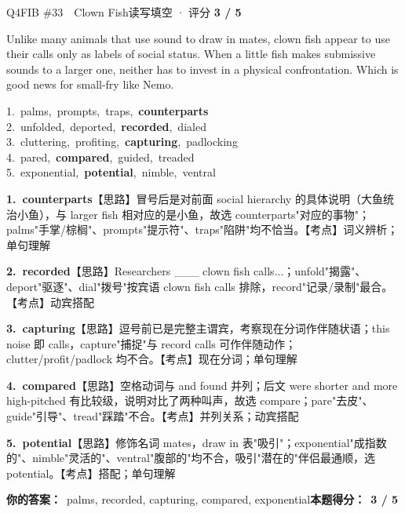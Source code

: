 \begin{qblock}{Q4\quad FIB \#33\ \ Clown Fish}{读写填空 · 评分 \textcolor{cAccent}{\bfseries 3 / 5}}
\begin{promptbox}
Unlike many animals that use sound to draw in  mates, clown fish appear to use their calls only as labels of social status. When a little fish makes submissive sounds to a larger one, neither has to invest in a physical confrontation. Which is good news for small-fry like Nemo.
\end{promptbox}
{\small
1.\ palms,\ prompts,\ traps,\ \textbf{counterparts}\\
2.\ unfolded,\ deported,\ \textbf{recorded},\ dialed\\
3.\ cluttering,\ profiting,\ \textbf{capturing},\ padlocking\\
4.\ pared,\ \textbf{compared},\ guided,\ treaded\\
5.\ exponential,\ \textbf{potential},\ nimble,\ ventral}
\begin{notebox}\footnotesize
\textbf{1.\ counterparts}\quad【思路】冒号后是对前面 social hierarchy 的具体说明（大鱼统治小鱼），与 larger fish 相对应的是小鱼，故选 counterparts"对应的事物"；palms"手掌/棕榈"、prompts"提示符"、traps"陷阱"均不恰当。【考点】词义辨析；单句理解\par\smallskip
\textbf{2.\ recorded}\quad【思路】Researchers \_\_\_ clown fish calls...；unfold"揭露"、deport"驱逐"、dial"拨号"按宾语 clown fish calls 排除，record"记录/录制"最合。【考点】动宾搭配\par\smallskip
\textbf{3.\ capturing}\quad【思路】逗号前已是完整主谓宾，考察现在分词作伴随状语；this noise 即 calls，capture"捕捉"与 record calls 可作伴随动作；clutter/profit/padlock 均不合。【考点】现在分词；单句理解\par\smallskip
\textbf{4.\ compared}\quad【思路】空格动词与 and found 并列；后文 were shorter and more high-pitched 有比较级，说明对比了两种叫声，故选 compare；pare"去皮"、guide"引导"、tread"踩踏"不合。【考点】并列关系；动宾搭配\par\smallskip
\textbf{5.\ potential}\quad【思路】修饰名词 mates，draw in 表"吸引"；exponential"成指数的"、nimble"灵活的"、ventral"腹部的"均不合，吸引"潜在的"伴侣最通顺，选 potential。【考点】搭配；单句理解
\end{notebox}
\smallskip
\textbf{你的答案：}\ {\color{cWrong}palms}, recorded, capturing, compared, {\color{cWrong}exponential}\qquad\textbf{本题得分：}\ {\color{cAccent}\bfseries 3 / 5}
\end{qblock}

